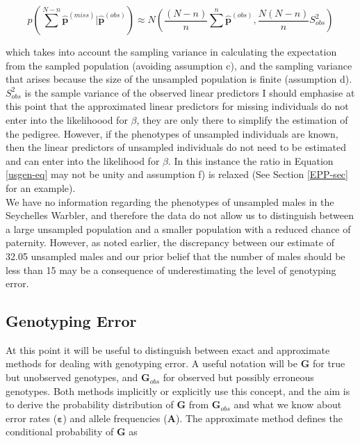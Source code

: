 \documentclass{article}
\begin{document}
\begin{equation}
p(\sum^{N-n}{\bm{\hat{p}}^{(miss)}} | \bm{\hat{p}}^{(obs)}) \approx N(\frac{(N-n)}{n}\sum^{n}\bm{\hat{p}}^{(obs)}, \frac{N(N-n)}{n}S_{obs}^{2})
\end{equation}

which takes into account the sampling variance in calculating the expectation from the sampled population (avoiding assumption c), and the sampling variance that arises because the size of the unsampled population is finite (assumption d). $S_{obs}^{2}$ is the sample variance of the observed linear predictors \citep[see][Chapter 7]{Gelman.2004}   I should emphasise at this point that the approximated linear predictors for missing individuals do not enter into the likelihoood for $\beta$, they are only there to simplify the estimation of the pedigree.  However, if the phenotypes of unsampled individuals are known, then the linear predictors of unsampled individuals do not need to be estimated and can enter into the likelihood for $\beta$.  In  this instance the ratio in Equation \ref{usgen-eq} may not be unity and assumption f) is relaxed (See Section \ref{EPP-sec} for an example).\\

We have no information regarding the phenotypes of unsampled males in the Seychelles Warbler, and therefore the data do not allow us to distinguish between a large unsampled population and a smaller population with a reduced chance of paternity.  However, as noted earlier, the discrepancy between our estimate of 32.05 unsampled males and our prior belief that the number of males should be less than 15 may be a consequence of underestimating the level of genotyping error.

\subsection{Genotyping Error}
\label{GE-sec}

At this point it will be useful to distinguish between exact and approximate methods for dealing with genotyping error.  A useful notation will be $\bm{G}$ for true but unobserved genotypes, and $\bm{G}_{obs}$ for observed but possibly erroneous genotypes.  Both methods implicitly or explicitly use this concept, and the aim is to derive the probability distribution of $\bm{G}$ from $\bm{G}_{obs}$ and what we know about error rates (${\bm \varepsilon}$) and allele frequencies ($\bm{A}$).  The approximate method defines the conditional probability of $\bm{G}$ as
\end{document}
